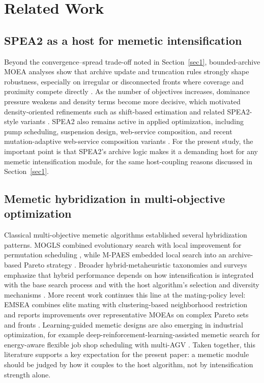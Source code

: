 \documentclass[pdflatex,sn-mathphys-ay]{sn-jnl}%
\theoremstyle{thmstyleone}%
\theoremstyle{thmstyletwo}%
\theoremstyle{thmstylethree}%
\begin{document}
\section{Related Work}\label{sec:related}

\subsection{SPEA2 as a host for memetic intensification}\label{subsec:rw-spea2}
Beyond the convergence--spread trade-off noted in Section~\ref{sec1}, bounded-archive MOEA analyses show that archive update and truncation rules strongly shape robustness, especially on irregular or disconnected fronts where coverage and proximity compete directly \citep{knowles2003properties, bosman2003balance}. As the number of objectives increases, dominance pressure weakens and density terms become more decisive, which motivated density-oriented refinements such as shift-based estimation and related SPEA2-style variants \citep{li2014shift, li2015many}. SPEA2 also remains active in applied optimization, including pump scheduling, suspension design, web-service composition, and recent mutation-adaptive web-service composition variants \citep{Lopez2005, gadhvi2016suspension, Cremene2016, WangDu2024SPEA2}. For the present study, the important point is that SPEA2's archive logic makes it a demanding host for any memetic intensification module, for the same host-coupling reasons discussed in Section~\ref{sec1}.

\subsection{Memetic hybridization in multi-objective optimization}\label{subsec:rw-memetic}
Classical multi-objective memetic algorithms established several hybridization patterns. MOGLS combined evolutionary search with local improvement for permutation scheduling \citep{ishibuchi1998multi}, while M-PAES embedded local search into an archive-based Pareto strategy \citep{knowles2000memetic}. Broader hybrid-metaheuristic taxonomies and surveys emphasize that hybrid performance depends on how intensification is integrated with the base search process and with the host algorithm's selection and diversity mechanisms \citep{talbi2002taxonomy, blum2011hybrid}. More recent work continues this line at the mating-policy level: EMSEA combines elite mating with clustering-based neighborhood restriction and reports improvements over representative MOEAs on complex Pareto sets and fronts \citep{Lu2025}. Learning-guided memetic designs are also emerging in industrial optimization, for example deep-reinforcement-learning-assisted memetic search for energy-aware flexible job shop scheduling with multi-AGV \citep{ZhangLiGong2024DRLMA}. Taken together, this literature supports a key expectation for the present paper: a memetic module should be judged by how it couples to the host algorithm, not by intensification strength alone.
\end{document}
